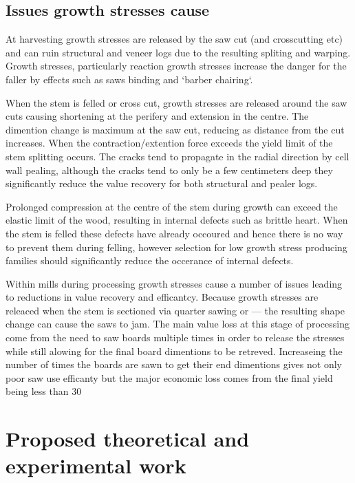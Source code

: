 \documentclass{article}
\begin{document}
\subsection{Issues growth stresses cause }

At harvesting growth stresses are released by the saw cut (and crosscutting etc)
and can ruin structural and veneer logs due to the resulting spliting and
warping. Growth stresses, particularly reaction growth stresses increase the
danger for the faller by effects such as saws binding and `barber chairing`.

When the stem is felled or cross cut, growth stresses are released around the
saw cuts causing shortening at the perifery and extension in the centre. The
dimention change is maximum at the saw cut, reducing as distance from the cut
increases. When the contraction/extention force exceeds the yield limit of the
stem splitting occurs. The cracks tend to propagate in the radial direction by
cell wall pealing, although the cracks tend to only be a few centimeters deep
they significantly reduce the value recovery for both structural and pealer
logs.

Prolonged compression at the centre of the stem during growth can exceed the
elastic limit of the wood, resulting in internal defects such as brittle heart.
When the stem is felled these defects have already occoured and hence there is
no way to prevent them during felling, however selection for low growth stress
producing families should significantly reduce the occerance of internal
defects.

Within mills during processing growth stresses cause a number of issues leading
to reductions in value recovery and efficantcy. Because growth stresses are
releaced when the stem is sectioned via quarter sawing or --- the resulting
shape change can cause the saws to jam. The main value loss at this stage of
processing come from the need to saw boards multiple times in order to release
the stresses while still alowing for the final board dimentions to be retreved.
Increaseing the number of times the boards are sawn to get their end dimentions
gives not only poor saw use efficanty but the major economic loss comes from the
final yield being less than 30%


\section{Proposed theoretical and experimental work}
\end{document}
